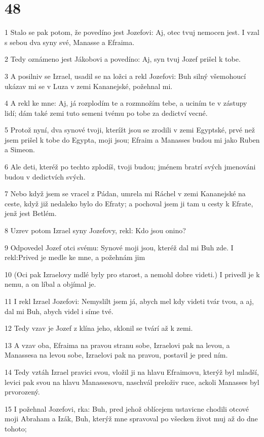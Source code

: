 \chapter{48}

\par 1 Stalo se pak potom, že povedíno jest Jozefovi: Aj, otec tvuj nemocen jest. I vzal s sebou dva syny své, Manasse a Efraima.
\par 2 Tedy oznámeno jest Jákobovi a povedíno: Aj, syn tvuj Jozef prišel k tobe.
\par 3 A posilniv se Izrael, usadil se na ložci a rekl Jozefovi: Buh silný všemohoucí ukázav mi se v Luza v zemi Kananejské, požehnal mi.
\par 4 A rekl ke mne: Aj, já rozplodím te a rozmnožím tebe, a uciním te v zástupy lidí; dám také zemi tuto semeni tvému po tobe za dedictví vecné.
\par 5 Protož nyní, dva synové tvoji, kterížt jsou se zrodili v zemi Egyptské, prvé než jsem prišel k tobe do Egypta, moji jsou; Efraim a Manasses budou mi jako Ruben a Simeon.
\par 6 Ale deti, kteréž po techto zplodíš, tvoji budou; jménem bratrí svých jmenováni budou v dedictvích svých.
\par 7 Nebo když jsem se vracel z Pádan, umrela mi Ráchel v zemi Kananejské na ceste, když již nedaleko bylo do Efraty; a pochoval jsem ji tam u cesty k Efrate, jenž jest Betlém.
\par 8 Uzrev potom Izrael syny Jozefovy, rekl: Kdo jsou onino?
\par 9 Odpovedel Jozef otci svému: Synové moji jsou, kteréž dal mi Buh zde. I rekl:Prived je medle ke mne, a požehnám jim
\par 10 (Oci pak Izraelovy mdlé byly pro starost, a nemohl dobre videti.) I privedl je k nemu, a on líbal a objímal je.
\par 11 I rekl Izrael Jozefovi: Nemyslilt jsem já, abych mel kdy videti tvár tvou, a aj, dal mi Buh, abych videl i síme tvé.
\par 12 Tedy vzav je Jozef z klína jeho, sklonil se tvárí až k zemi.
\par 13 A vzav oba, Efraima na pravou stranu sobe, Izraelovi pak na levou, a Manassesa na levou sobe, Izraelovi pak na pravou, postavil je pred ním.
\par 14 Tedy vztáh Izrael pravici svou, vložil ji na hlavu Efraimovu, kterýž byl mladší, levici pak svou na hlavu Manassesovu, naschvál preloživ ruce, ackoli Manasses byl prvorozený.
\par 15 I požehnal Jozefovi, rka: Buh, pred jehož oblícejem ustavicne chodili otcové moji Abraham a Izák, Buh, kterýž mne spravoval po všecken život muj až do dne tohoto;
